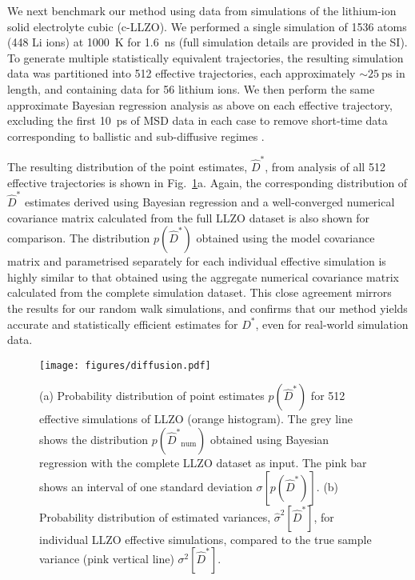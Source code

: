 \documentclass[reprint,superscriptaddress,nobibnotes,amsmath,amssymb,aps,prx,hidelinks]{revtex4-2}
\newcommand{\prob}[1]{\ensuremath{p(#1)}}
\newcommand{\Dest}{\ensuremath{\widehat{D}^*}}
\newcommand{\D}{\ensuremath{D^*}}
\newcommand{\var}[1]{\ensuremath{\sigma^2[#1]}}
\newcommand{\varest}[1]{\ensuremath{\widehat{\sigma}^2[#1]}}
\begin{document}
We next benchmark our method using data from simulations of the lithium-ion solid electrolyte cubic  (c-LLZO).
We performed a single simulation of \num{1536} atoms (\num{448} Li ions) at \SI{1000}{K} for \SI{1.6}{\nano\second} (full simulation details are provided in the SI).
To generate multiple statistically equivalent trajectories, the resulting simulation data was partitioned into \num{512} effective trajectories, each approximately $\sim\SI{25}{\ps}$ in length, and containing data for \num{56} lithium ions.
We then perform the same approximate Bayesian regression analysis as above on each effective trajectory, excluding the first \SI{10}{ps} of MSD data in each case to remove short-time data corresponding to ballistic and sub-diffusive regimes \cite{he_statistical_2018}.

The resulting distribution of the point estimates, $\Dest$, from analysis of all \num{512} effective trajectories is shown in Fig.~\ref{fig:diffusion}a.
Again, the corresponding distribution of $\Dest$ estimates derived using Bayesian regression and a well-converged numerical covariance matrix calculated from the full LLZO dataset is also shown for comparison.
The distribution $\prob{\Dest}$ obtained using the model covariance matrix and parametrised separately for each individual effective simulation is highly similar to that obtained using the aggregate numerical covariance matrix calculated from the complete simulation dataset.
This close agreement mirrors the results for our random walk simulations, and confirms that our method yields accurate and statistically efficient estimates for $\D$, even for real-world simulation data.

\begin{figure}
    \centering
    \texttt{[image: figures/diffusion.pdf]}
    \caption{
      (a) Probability distribution of point estimates $\prob{\Dest}$ for \num{512} effective simulations of LLZO (orange histogram).
      The grey line shows the distribution $\prob{\Dest_\mathrm{num}}$ obtained using Bayesian regression with the complete LLZO dataset as input.
      The pink bar shows an interval of one standard deviation $\sigma[\prob{\Dest}]$.
      (b) Probability distribution of estimated variances, $\varest{\Dest}$, for individual LLZO effective simulations, compared to the true sample variance (pink vertical line) $\var{\Dest}$.
    }
    \label{fig:diffusion}
\end{figure}
\end{document}
